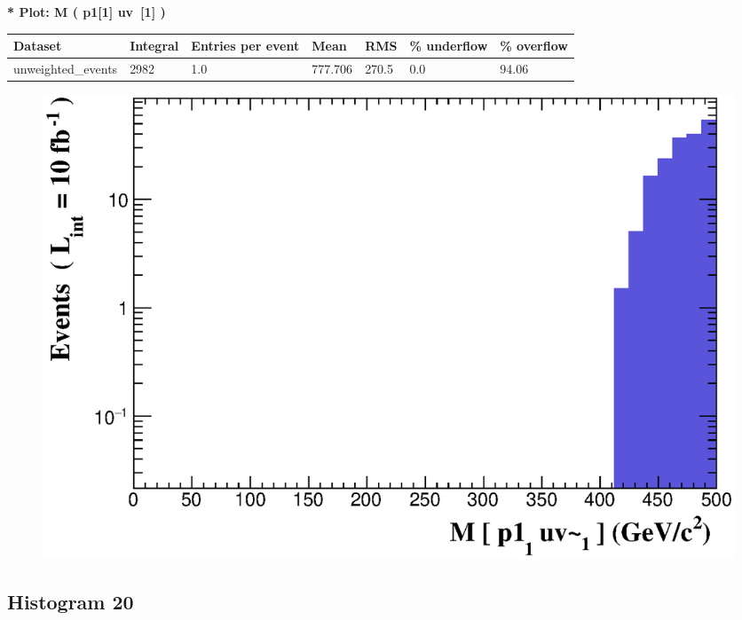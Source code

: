 \documentclass[a4paper, 10pt]{article}
\begin{document}
\textbf{* Plot: M ( p1[1] uv~[1] ) }\\
   \begin{table}[H]
  \begin{center}
    \begin{tabular}{|m{23.0mm}|m{23.0mm}|m{18.0mm}|m{19.0mm}|m{19.0mm}|m{19.0mm}|m{19.0mm}|}
      \hline
      {\cellcolor{yellow}         Dataset}& {\cellcolor{yellow}         Integral}& {\cellcolor{yellow}         Entries per event}& {\cellcolor{yellow}         Mean}& {\cellcolor{yellow}         RMS}& {\cellcolor{yellow}         \% underflow}& {\cellcolor{yellow}         \% overflow}\\
      \hline
      {\cellcolor{white}         unweighted\_events}& {\cellcolor{white}         2982}& {\cellcolor{white}         1.0}& {\cellcolor{white}         777.706}& {\cellcolor{white}         270.5}& {\cellcolor{red}         0.0}& {\cellcolor{red}         94.06}\\
\hline
    \end{tabular}
  \end{center}
\end{table}

\begin{figure}[H]
  \begin{center}
    \includegraphics[scale=0.45]{selection_18.eps}\\
\caption{   }
  \end{center}
\end{figure}
      \newpage
\subsection{ Histogram 20}
\end{document}
